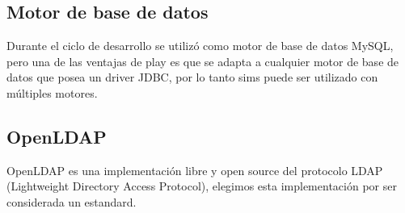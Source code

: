 \subsection{Motor de base de datos}

Durante el ciclo de desarrollo se utilizó como motor de base de datos MySQL, pero una de las ventajas de play es que se adapta a cualquier motor de
base de datos que posea un driver JDBC, por lo tanto sims puede ser utilizado con múltiples motores.

\subsection{OpenLDAP}

OpenLDAP es una implementación libre y open source del protocolo LDAP (Lightweight Directory Access Protocol), elegimos esta implementación por ser considerada un estandard.





